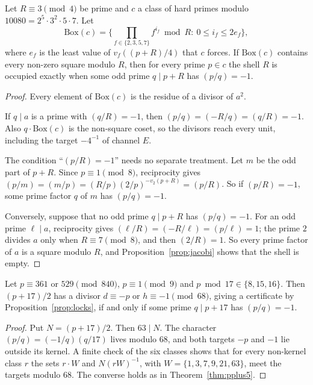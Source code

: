 \begin{theorem}\label{thm:visiblebox}
Let $R\equiv3\pmod4$ be prime and $c$ a class of hard primes modulo $10080=2^5\cdot3^2\cdot5\cdot7$. Let
\[
\mathrm{Box}(c)=\Big\{\prod_{f\in\{2,3,5,7\}}f^{i_f}\bmod R:\ 0\le i_f\le2e_f\Big\},
\]
where $e_f$ is the least value of $v_f((p+R)/4)$ that $c$ forces. If $\mathrm{Box}(c)$ contains every non-zero square modulo $R$, then for every prime $p\in c$ the shell $R$ is occupied exactly when some odd prime $q\mid p+R$ has $(p/q)=-1$.
\end{theorem}
\begin{proof}
Every element of $\mathrm{Box}(c)$ is the residue of a divisor of $a^2$.

If $q\mid a$ is a prime with $(q/R)=-1$, then $(p/q)=(-R/q)=(q/R)=-1$. Also $q\cdot\mathrm{Box}(c)$ is the non-square coset, so the divisors reach every unit, including the target $-4^{-1}$ of channel $E$.

The condition ``$(p/R)=-1$'' needs no separate treatment. Let $m$ be the odd part of $p+R$. Since $p\equiv1\pmod8$, reciprocity gives $(p/m)=(m/p)=(R/p)(2/p)^{-v_2(p+R)}=(p/R)$. So if $(p/R)=-1$, some prime factor $q$ of $m$ has $(p/q)=-1$.

Conversely, suppose that no odd prime $q\mid p+R$ has $(p/q)=-1$. For an odd prime $\ell\mid a$, reciprocity gives $(\ell/R)=(-R/\ell)=(p/\ell)=1$; the prime $2$ divides $a$ only when $R\equiv7\pmod8$, and then $(2/R)=1$. So every prime factor of $a$ is a square modulo $R$, and Proposition~\ref{prop:jacobi} shows that the shell is empty.
\end{proof}

\begin{proposition}[$\mu=17$]\label{prop:mu17}
Let $p\equiv361$ or $529\pmod{840}$, $p\equiv1\pmod9$ and $p\bmod17\in\{8,15,16\}$. Then $(p+17)/2$ has a divisor $d\equiv-p$ or $h\equiv-1\pmod{68}$, giving a certificate by Proposition~\ref{prop:locks}, if and only if some prime $q\mid p+17$ has $(p/q)=-1$.
\end{proposition}
\begin{proof}
Put $N=(p+17)/2$. Then $63\mid N$. The character $(p/q)=(-1/q)(q/17)$ lives modulo $68$, and both targets $-p$ and $-1$ lie outside its kernel. A finite check of the six classes shows that for every non-kernel class $r$ the sets $r\cdot W$ and $N(rW)^{-1}$, with $W=\{1,3,7,9,21,63\}$, meet the targets modulo $68$. The converse holds as in Theorem~\ref{thm:pplus5}.
\end{proof}

